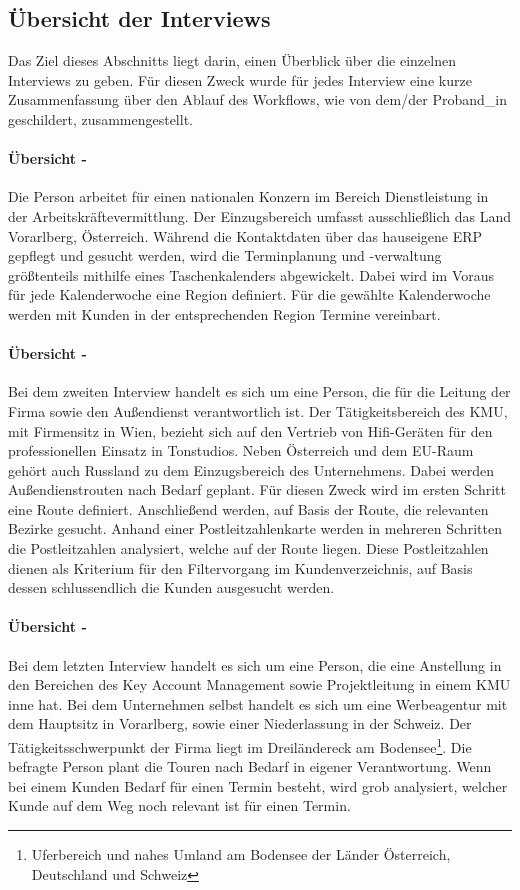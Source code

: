 \documentclass[Bachelorarbeit.tex]{subfiles}
\begin{document}
\subsection{Übersicht der Interviews}
\label{UebersichtDerInterviews}
Das Ziel dieses Abschnitts liegt darin, einen Überblick über die einzelnen Interviews zu geben. 
Für diesen Zweck wurde für jedes Interview eine kurze Zusammenfassung über den Ablauf des Workflows, wie von dem/der Proband\_in geschildert, zusammengestellt.

\paragraph*{Übersicht - } 
Die Person arbeitet für einen nationalen Konzern im Bereich Dienstleistung in der Arbeitskräftevermittlung. 
Der Einzugsbereich umfasst ausschließlich das Land Vorarlberg, Österreich.
Während die Kontaktdaten über das hauseigene \ac{ERP} gepflegt und gesucht werden, wird die Terminplanung und -verwaltung größtenteils mithilfe eines Taschenkalenders abgewickelt.
Dabei wird im Voraus für jede Kalenderwoche eine Region definiert. 
Für die gewählte Kalenderwoche werden mit Kunden in der entsprechenden Region Termine vereinbart.

\paragraph*{Übersicht - }
Bei dem zweiten Interview handelt es sich um eine Person, die für die Leitung der Firma sowie den Außendienst verantwortlich ist.
Der Tätigkeitsbereich des \ac{KMU}, mit Firmensitz in Wien, bezieht sich auf den Vertrieb von Hifi-Geräten für den professionellen Einsatz in Tonstudios.
Neben Österreich und dem EU-Raum gehört auch Russland zu dem Einzugsbereich des Unternehmens.
Dabei werden Außendienstrouten nach Bedarf geplant.
Für diesen Zweck wird im ersten Schritt eine Route definiert. 
Anschließend werden, auf Basis der Route, die relevanten Bezirke gesucht.
Anhand einer Postleitzahlenkarte werden in mehreren Schritten die Postleitzahlen analysiert, welche auf der Route liegen.
Diese Postleitzahlen dienen als Kriterium für den Filtervorgang im Kundenverzeichnis, auf Basis dessen schlussendlich die Kunden ausgesucht werden.

\paragraph*{Übersicht - }
Bei dem letzten Interview handelt es sich um eine Person, die eine Anstellung in den Bereichen des Key Account Management sowie Projektleitung in einem \ac{KMU} inne hat.
Bei dem Unternehmen selbst handelt es sich um eine Werbeagentur mit dem Hauptsitz in Vorarlberg, sowie einer Niederlassung in der Schweiz.
Der Tätigkeitsschwerpunkt der Firma liegt im Dreiländereck am Bodensee\footnote{Uferbereich und nahes Umland am Bodensee der Länder Österreich, Deutschland und Schweiz}. 
Die befragte Person plant die Touren nach Bedarf in eigener Verantwortung.
Wenn bei einem Kunden Bedarf für einen Termin besteht, wird grob analysiert, welcher Kunde auf dem Weg noch relevant ist für einen Termin.
\newpage
\end{document}

